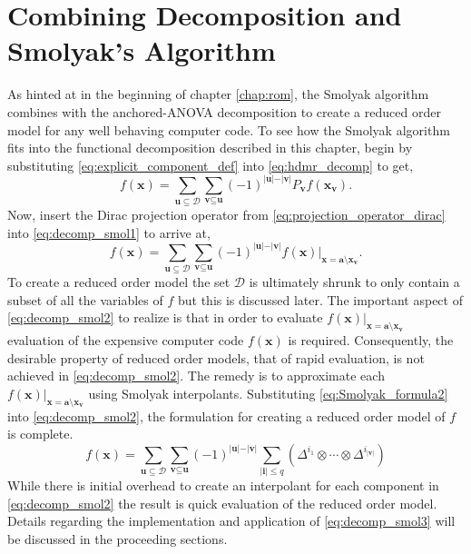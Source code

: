 \section{Combining Decomposition and Smolyak's Algorithm} \label{sec:decomp_and_interp}

As hinted at in the beginning of chapter \ref{chap:rom}, the Smolyak algorithm combines with the anchored-\ac{ANOVA} decomposition to create a reduced order model for any well behaving computer code. To see how the Smolyak algorithm fits into the functional decomposition described in this chapter, begin by substituting \ref{eq:explicit_component_def} into \ref{eq:hdmr_decomp} to get,
\begin{equation} \label{eq:decomp_smol1}
   f(\textbf{x}) = 
    \sum_{\textbf{u}\subseteq\mathcal{D}}
     \sum_{\textbf{v}\subseteq\textbf{u}} 
      (-1)^{\vert\textbf{u}\vert - \vert\textbf{v}\vert}
       P_{\textbf{v}} f(\textbf{x}_{\textbf{v}}).
\end{equation} 
Now, insert the Dirac projection operator from \ref{eq:projection_operator_dirac} into \ref{eq:decomp_smol1} to arrive at,  
\begin{equation} \label{eq:decomp_smol2}
   f(\textbf{x}) = 
    \sum_{\textbf{u}\subseteq\mathcal{D}}
     \sum_{\textbf{v}\subseteq\textbf{u}} 
      (-1)^{\vert\textbf{u}\vert - \vert\textbf{v}\vert}
       f(\textbf{x})\vert_{  
        \textbf{x}=\textbf{a}\setminus\textbf{x}_{\textbf{v}} }.   
\end{equation}
To create a reduced order model the set $\mathcal{D}$ is ultimately shrunk to only contain a subset of all the variables of $f$ but this is discussed later. The important aspect of \ref{eq:decomp_smol2} to realize is that in order to evaluate $ f(\textbf{x}) \vert_{\textbf{x} = \textbf{a} \setminus \textbf{x}_{\textbf{v}}}$ evaluation of the expensive computer code $f(\textbf{x})$ is required. Consequently, the desirable property of reduced order models, that of rapid evaluation, is not achieved in \ref{eq:decomp_smol2}. The remedy is to approximate each $ f(\textbf{x}) \vert_{\textbf{x} = \textbf{a} \setminus \textbf{x}_{\textbf{v}}}$ using Smolyak interpolants. Substituting \ref{eq:Smolyak_formula2} into \ref{eq:decomp_smol2}, the formulation for creating a reduced order model of $f$ is complete. 
\begin{equation} \label{eq:decomp_smol3}
   f(\textbf{x}) = 
    \sum_{\textbf{u}\subseteq\mathcal{D}}
     \sum_{\textbf{v}\subseteq\textbf{u}} 
      (-1)^{\vert\textbf{u}\vert - \vert\textbf{v}\vert}
       \sum_{\vert\textbf{i}\vert\leq q}\left(
        \Delta^{i_1}\otimes\cdots\otimes\Delta^{i_{\vert\textbf{v}\vert}}
         \right)  
\end{equation}
While there is initial overhead to create an interpolant for each component in \ref{eq:decomp_smol2} the result is quick evaluation of the reduced order model. Details regarding the implementation and application of \ref{eq:decomp_smol3} will be discussed in the proceeding sections.               
 
